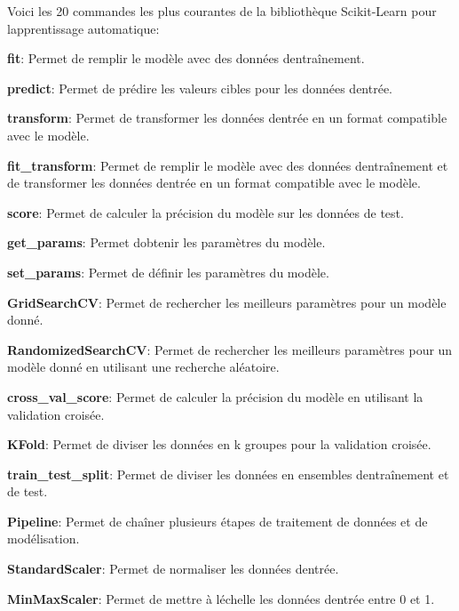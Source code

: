 Voici les 20 commandes les plus courantes de la bibliothèque Scikit-\/\+Learn pour l\textquotesingle{}apprentissage automatique\+:


\begin{DoxyEnumerate}
\item {\bfseries fit}\+: Permet de remplir le modèle avec des données d\textquotesingle{}entraînement.
\item {\bfseries predict}\+: Permet de prédire les valeurs cibles pour les données d\textquotesingle{}entrée.
\item {\bfseries transform}\+: Permet de transformer les données d\textquotesingle{}entrée en un format compatible avec le modèle.
\item {\bfseries fit\+\_\+transform}\+: Permet de remplir le modèle avec des données d\textquotesingle{}entraînement et de transformer les données d\textquotesingle{}entrée en un format compatible avec le modèle.
\item {\bfseries score}\+: Permet de calculer la précision du modèle sur les données de test.
\item {\bfseries get\+\_\+params}\+: Permet d\textquotesingle{}obtenir les paramètres du modèle.
\item {\bfseries set\+\_\+params}\+: Permet de définir les paramètres du modèle.
\item {\bfseries Grid\+Search\+CV}\+: Permet de rechercher les meilleurs paramètres pour un modèle donné.
\item {\bfseries Randomized\+Search\+CV}\+: Permet de rechercher les meilleurs paramètres pour un modèle donné en utilisant une recherche aléatoire.
\item {\bfseries cross\+\_\+val\+\_\+score}\+: Permet de calculer la précision du modèle en utilisant la validation croisée.
\item {\bfseries K\+Fold}\+: Permet de diviser les données en k groupes pour la validation croisée.
\item {\bfseries train\+\_\+test\+\_\+split}\+: Permet de diviser les données en ensembles d\textquotesingle{}entraînement et de test.
\item {\bfseries Pipeline}\+: Permet de chaîner plusieurs étapes de traitement de données et de modélisation.
\item {\bfseries Standard\+Scaler}\+: Permet de normaliser les données d\textquotesingle{}entrée.
\item {\bfseries Min\+Max\+Scaler}\+: Permet de mettre à l\textquotesingle{}échelle les données d\textquotesingle{}entrée entre 0 et 1.

\end{DoxyEnumerate}
